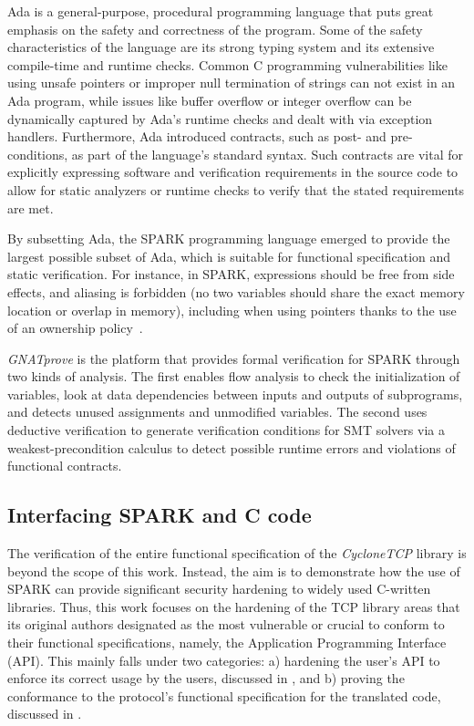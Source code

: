 \documentclass[conference]{IEEEtran}
\begin{document}
Ada is a general-purpose, procedural programming language that puts great emphasis on the safety and correctness of the program. Some of the safety characteristics of the language are its strong typing system and its extensive compile-time and runtime checks. Common C programming vulnerabilities like using unsafe pointers or improper null termination of strings can not exist in an Ada program, while issues like buffer overflow or integer overflow can be dynamically captured by Ada’s runtime checks and dealt with via exception handlers. Furthermore, Ada introduced contracts, such as post- and pre-conditions, as part of the language’s standard syntax. Such contracts are vital for explicitly expressing software and verification requirements in the source code to allow for static analyzers or runtime checks to verify that the stated requirements are met.

By subsetting Ada, the SPARK programming language \cite{mccormick_chapin_2015} emerged to provide the largest possible subset of Ada, which is suitable for functional specification and static verification. For instance, in SPARK, expressions should be free from side effects, and aliasing is forbidden (no two variables should share the exact memory location or overlap in memory), including when using pointers thanks to the use of an ownership policy~\cite{dross2020recursive}.

\emph{GNATprove} \cite{GNATProve:users_manual} is the platform that provides formal verification for SPARK through two kinds of analysis. The first enables flow analysis to check the initialization of variables, look at data dependencies between inputs and outputs of subprograms, and detects unused assignments and unmodified variables. The second uses deductive verification to generate verification conditions for SMT solvers via a weakest-precondition calculus to detect possible runtime errors and violations of functional contracts.



\subsection{Interfacing SPARK and C code}

The verification of the entire functional specification of the \emph{CycloneTCP} library is beyond the scope of this work. Instead, the aim is to demonstrate how the use of SPARK can provide significant security hardening to widely used C-written libraries. Thus, this work focuses on the hardening of the TCP library areas that its original authors designated as the most vulnerable or crucial to conform to their functional specifications, namely, the Application Programming Interface (API). This mainly falls under two categories: a)  hardening the user's API to enforce its correct usage by the users, discussed in , and b) proving the conformance to the protocol's functional specification for the translated code, discussed in .
\end{document}

